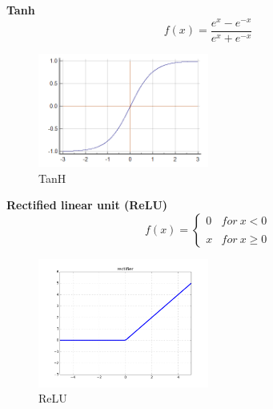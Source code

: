 \documentclass[a4paper]{article}
\begin{document}
\textbf{Tanh}
$$f(x)=\frac{e^{x}-e^{-x}}{e^{x}+e^{-x}}$$
\begin{figure}[H]
\centering
\includegraphics[width=0.5\textwidth]{tanh.png}
\caption{\label{fig:frog}TanH}
\end{figure}

\textbf{Rectified linear unit (ReLU)\cite{nano4}}
$$f(x)=\left\{\begin{matrix}
0 & for\ x< 0\\ 
 & \\ 
x & for\ x\geq 0 
\end{matrix}\right.$$
\begin{figure}[H]
\centering
\includegraphics[width=0.5\textwidth]{RELU.png}
\caption{\label{fig:frog}ReLU}
\end{figure}
\end{document}
